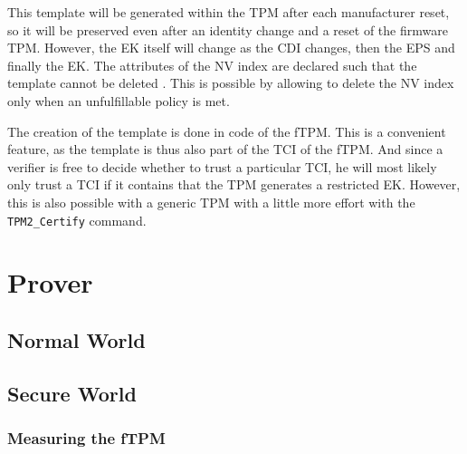 This template will be generated within the TPM after each manufacturer reset, so it will be preserved even after an identity change and a reset of the firmware TPM.
However, the EK itself will change as the CDI changes, then the EPS and finally the EK.
The attributes of the NV index are declared such that the template cannot be deleted \cite{tcgPcClient}.
This is possible by allowing to delete the NV index only when an unfulfillable policy is met.

The creation of the template is done in code of the fTPM.
This is a convenient feature, as the template is thus also part of the TCI of the fTPM.
And since a verifier is free to decide whether to trust a particular TCI, he will most likely only trust a TCI if it contains that the TPM generates a restricted EK.
However, this is also possible with a generic TPM with a little more effort with the \texttt{TPM2\_Certify} command.



\section{Prover}
\subsection{Normal World}

\subsection{Secure World}

\subsubsection{Measuring the fTPM}

